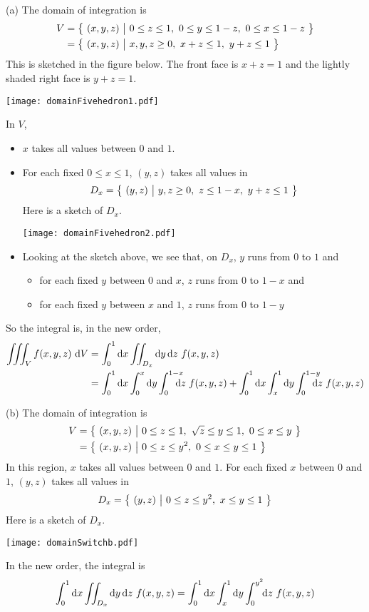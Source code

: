 \begin{solution}
(a)
 The domain of integration is 
\begin{align*}
V &= \big\{ \ (x,y,z)\ \big|\ 0\le z\le 1,\ 0\le y\le 1-z,\ 0\le x\le 1-z\ \big\} \\
  &= \big\{ \ (x,y,z)\ \big|\  x,y,z\ge 0,\ x+z\le 1,\ y+z\le 1 \ \big\}
\end{align*}
This is sketched in the figure below. The front face is $x+z=1$ and the 
lightly shaded right face is $y+z=1$.
\begin{center}
     \texttt{[image: domainFivehedron1.pdf]}
\end{center}
In $V$, 
\begin{itemize}
\item
$x$ takes all values between $0$ and $1$. 
\item
For each fixed $0\le x\le 1$, $(y,z)$ takes all values in
\begin{equation*}
D_x=\big\{ \ (y,z)\ \big|\ y,z\ge 0,\ z\le 1-x,\ y+z\le 1\ \big\}
\end{equation*}
Here is a sketch of $D_x$.
\begin{center}
     \texttt{[image: domainFivehedron2.pdf]}
\end{center}
\item 
Looking at the sketch above, we see that, on $D_x$, $y$ runs from $0$ to $1$
and
\begin{itemize}
\item
for each fixed $y$ between $0$ and $x$, $z$ runs from $0$ to $1-x$ and
\item
for each fixed $y$ between $x$ and $1$, $z$ runs from $0$ to $1-y$
\end{itemize}
\end{itemize}
So the integral is, in the new order, 
\begin{align*}
\tripInt_V f(x,y,z)\ \dee{V}
&= \int_0^1\dee{x}\dblInt_{D_x} \dee{y}\,\dee{z}\ f(x,y,z) \\
&= \int_0^1\dee{x}\int_0^{x}\dee{y}\int_0^{1-x}\hskip-10pt \dee{z}\hskip3pt f(x,y,z)
+\int_0^1\dee{x}\int_x^{1}\dee{y}\int_0^{1-y}\hskip-10pt \dee{z}\hskip3pt f(x,y,z)
\end{align*}


(b) The domain of integration is 
\begin{align*}
V &= \big\{ \ (x,y,z)\ \big|\ 0\le z\le 1,\ \sqrt{z}\le y\le 1,\ 0\le x\le y\ \big\} \\
  &= \big\{ \ (x,y,z)\ \big|\ 0\le z\le y^2,\ 0\le x\le y\le 1\ \big\} 
\end{align*}
In this region, $x$ takes all values between $0$ and $1$. For each fixed
$x$ between $0$ and $1$, $(y,z)$ takes all values in
\begin{equation*}
D_x=\big\{ \ (y,z)\ \big|\ 0\le z\le y^2,\ x\le y\le 1\ \big\}
\end{equation*}
Here is a sketch of $D_x$.
\begin{center}
     \texttt{[image: domainSwitchb.pdf]}
\end{center}
In the new order, the integral is
\begin{equation*}
\int_0^1\dee{x}\dblInt_{D_x} \dee{y}\,\dee{z}\ f(x,y,z)
=\int_0^1\dee{x}\int_x^{1}\dee{y}\int_0^{y^2}\!\! \dee{z}\  f(x,y,z)
\end{equation*}
\end{solution}

